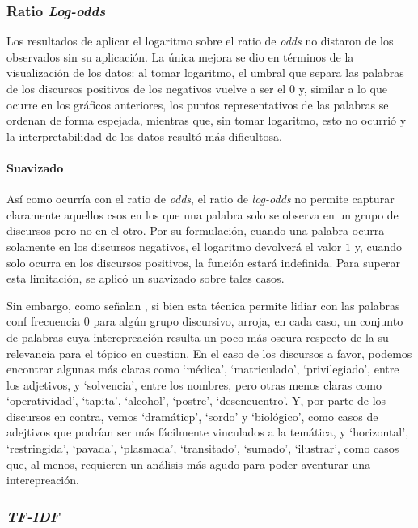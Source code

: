 \subsubsection{Ratio \textit{Log-odds}}

Los resultados de aplicar el logaritmo sobre el ratio de \textit{odds} no distaron
de los observados sin su aplicaci\'on. La \'unica mejora se dio en
t\'erminos de la visualizaci\'on de los datos: al tomar logaritmo, el umbral que separa
las palabras de los discursos positivos de los negativos vuelve a ser el $0$ y,
similar a lo que ocurre en los gr\'aficos anteriores, los puntos representativos
de las palabras se ordenan de forma espejada, mientras que, sin tomar logaritmo,
esto no ocurri\'o y la interpretabilidad de los datos result\'o m\'as dificultosa.

\paragraph{Suavizado}
As\'i como ocurr\'ia con el ratio de \textit{odds}, el ratio de \textit{log-odds} no
permite capturar claramente aquellos csos en los que una palabra solo se observa en
un grupo de discursos pero no en el otro. Por su formulaci\'on, cuando una palabra
ocurra solamente en los discursos negativos, el logaritmo devolver\'a el valor $1$ y,
cuando solo ocurra en los discursos positivos, la funci\'on estar\'a indefinida. Para
superar esta limitaci\'on, se aplic\'o un suavizado sobre tales casos.
\par
Sin embargo, como señalan \cite{monroe2008fightin}, si bien esta t\'ecnica permite
lidiar con las palabras conf frecuencia $0$ para alg\'un grupo discursivo, arroja,
en cada caso, un conjunto de palabras cuya interepreaci\'on resulta un poco m\'as
oscura respecto de la su relevancia para el t\'opico en cuestion. En el caso
de los discursos a favor, podemos encontrar algunas m\'as claras como `m\'edica',
`matriculado', `privilegiado', entre los adjetivos, y `solvencia', entre los nombres,
pero otras menos claras como `operatividad', `tapita', `alcohol', `postre',
`desencuentro'. Y, por parte de los discursos en contra, vemos `dram\'aticp', `sordo' y
`biol\'ogico', como casos de adejtivos que podr\'ian ser m\'as f\'acilmente vinculados a la
tem\'atica, y `horizontal', `restringida', `pavada', `plasmada', `transitado', `sumado',
`ilustrar', como casos que, al menos, requieren un an\'alisis m\'as agudo para poder
aventurar una interepreaci\'on.

\subsubsection{\textit{TF-IDF}}

